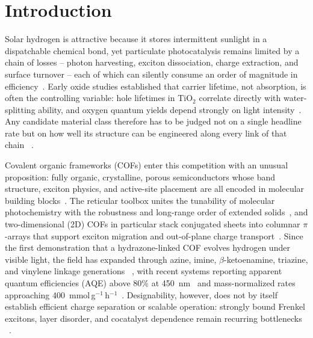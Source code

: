 \section{Introduction}
\label{sec:intro}

Solar hydrogen is attractive because it stores intermittent sunlight in a
dispatchable chemical bond, yet particulate photocatalysis remains limited by
a chain of losses -- photon harvesting, exciton dissociation, charge
extraction, and surface turnover -- each of which can silently consume an
order of magnitude in efficiency~\cite{tang2008mechanism,ma2022charge,
gu2023recent}. Early oxide studies established that carrier lifetime, not
absorption, is often the controlling variable: hole lifetimes in TiO$_2$
correlate directly with water-splitting ability, and oxygen quantum yields
depend strongly on light intensity~\cite{tang2008mechanism}. Any candidate
material class therefore has to be judged not on a single headline rate but
on how well its structure can be engineered along every link of that chain
~\cite{choi2024understanding,ghosh2020identification}.

Covalent organic frameworks (COFs) enter this competition with an unusual
proposition: fully organic, crystalline, porous semiconductors whose band
structure, exciton physics, and active-site placement are all encoded in
molecular building blocks~\cite{mishra2025covalent,qi2023recent,
lopezmagano2022recent,romero2021light}. The reticular toolbox unites the
tunability of molecular photochemistry with the robustness and long-range
order of extended solids~\cite{guntermann2026recent,khalil2024two,
bagheri2020towards}, and two-dimensional (2D) COFs in particular stack
conjugated sheets into columnar $\pi$-arrays that support exciton migration
and out-of-plane charge transport~\cite{zhou2021peg,wan2020a,jin20192d}.
Since the first demonstration that a hydrazone-linked COF evolves hydrogen
under visible light, the field has expanded through azine, imine,
$\beta$-ketoenamine, triazine, and vinylene linkage generations
~\cite{rodriguezcamargo2026a,haase2017structure,xue2023research,
peng2025sp2}, with recent systems reporting apparent quantum efficiencies
(AQE) above 80\% at 450~nm~\cite{li2022covalent} and mass-normalized rates
approaching 400~mmol\,g$^{-1}$\,h$^{-1}$~\cite{zhao2024nanoscale,gao20242d}.
Designability, however, does not by itself establish efficient charge
separation or scalable operation: strongly bound Frenkel excitons, layer
disorder, and cocatalyst dependence remain recurring bottlenecks
~\cite{bao2025excitonic,ran2024progress,zhang2025dual}.

